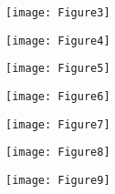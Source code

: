 \documentclass[10pt]{article}
\begin{document}
\newpage
\begin{figure}[!h]
\label{writeout}
\begin{center}
\texttt{[image: Figure3]}
\end{center}
\caption{}
\end{figure}


\newpage
\begin{figure}[!h]
\label{garcia}
\begin{center}
\texttt{[image: Figure4]}\\
\end{center}
\caption{}
\end{figure}

\newpage
\begin{figure}[!h]
\label{MGPU}
\begin{center}
\texttt{[image: Figure5]}
\end{center}
\caption{}
\end{figure}

\newpage
\begin{figure}[!h]
\label{MGPU}
\begin{center}
\texttt{[image: Figure6]}
\end{center}
\caption{}
\end{figure}

\newpage
\begin{figure}[!h]
\label{MGPU}
\begin{center}
\texttt{[image: Figure7]}
\end{center}
\caption{}
\end{figure}

\newpage
\begin{figure}[!h]
\label{MGPU}
\begin{center}
\texttt{[image: Figure8]}
\end{center}
\caption{}
\end{figure}

\newpage
\begin{figure}[!h]
\label{MGPU}
\begin{center}
\texttt{[image: Figure9]}
\end{center}
\caption{}
\end{figure}


 




 
\end{document}
